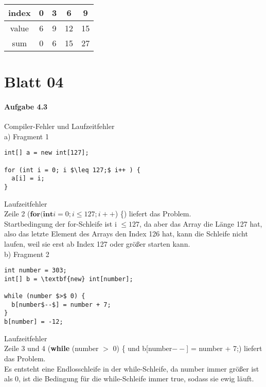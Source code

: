 \documentclass[paper=a4, fontsize=11pt]{scrartcl}
\numberwithin{equation}{section}
\numberwithin{figure}{section}
\numberwithin{table}{section}
\begin{document}
\begin{flushleft}
 \begin{tabular}{|c|c|c|c|c|}
  \hline
index & 0 & 3 &  6 & 9\\
  \hline
value & 6 & 9 & 12 & 15 \\
  \hline
sum & 0 & 6 & 15 & 27\\
  \hline
  \end{tabular}
\end{flushleft}



\newpage

\section{Blatt 04}

\paragraph{Aufgabe 4.3} Compiler-Fehler und Laufzeitfehler \\

a) Fragment 1 \\

\begin{lstlisting}
int[] a = new int[127]; 

for (int i = 0; i $\leq 127;$ i++ ) {
  a[i] = i; 
} 
\end{lstlisting}

Laufzeitfehler \\
Zeile 2 ($\textbf{for} ( \textbf{int} i = 0; i \leq 127; i++ $) \{) liefert das Problem. \\
Startbedingung der for-Schleife ist i $\leq 127$, da aber das Array die Länge 127 hat, also das letzte Element des Arrays den Index 126 hat, kann die Schleife nicht laufen, weil sie erst ab Index 127 oder größer starten kann. \\

b) Fragment 2 \\

\begin{lstlisting}
int number = 303; 
int[] b = \textbf{new} int[number]; 

while (number $>$ 0) {
  b[number$--$] = number + 7; 
} 
b[number] = -12;
\end{lstlisting}

Laufzeitfehler \\
Zeile 3 und 4 (\textbf{while} (number $>$ 0) \{ und b[number$--$] = number + 7;) liefert das Problem. \\
Es entsteht eine Endlosschleife in der while-Schleife, da number immer größer ist als 0, ist die Bedingung für die while-Schleife immer true, sodass sie ewig läuft.
\end{document}
